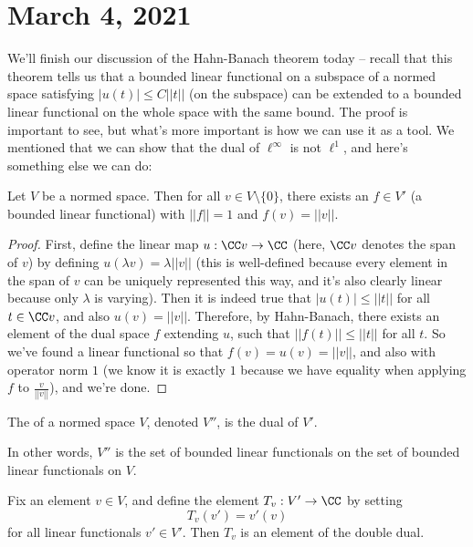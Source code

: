 \pagebreak\section*{March 4, 2021}

We'll finish our discussion of the Hahn-Banach theorem today -- recall that this theorem tells us that a bounded linear functional on a subspace of a normed space satisfying $|u(t)| \le C||t||$ (on the subspace) can be extended to a bounded linear functional on the whole space with the same bound. The proof is important to see, but what's more important is how we can use it as a tool. We mentioned that we can show that the dual of $\ell^{\infty}$ is not $\ell^1$, and here's something else we can do:

\begin{theorem}\label{hahnbanachapp1}
Let $V$ be a normed space. Then for all $v \in V \setminus \{0\}$, there exists an $f \in V'$ (a bounded linear functional) with $||f|| = 1$ and $f(v) = ||v||$.
\end{theorem}
\begin{proof}
First, define the linear map $u: \CC v \to \CC$ (here, $\CC v$ denotes the span of $v$) by defining $u(\lambda v) = \lambda ||v||$ (this is well-defined because every element in the span of $v$ can be uniquely represented this way, and it's also clearly linear because only $\lambda$ is varying). Then it is indeed true that $|u(t)| \le ||t||$ for all $t \in \CC v$, and also $u(v) = ||v||$. Therefore, by Hahn-Banach, there exists an element of the dual space $f$ extending $u$, such that $||f(t)|| \le ||t||$ for all $t$. So we've found a linear functional so that $f(v) = u(v) = ||v||$, and also with operator norm $1$ (we know it is exactly $1$ because we have equality when applying $f$ to $\frac{v}{||v||}$), and we're done. 
\end{proof}

\begin{definition}
The  of a normed space $V$, denoted $V''$, is the dual of $V'$.
\end{definition}

In other words, $V''$ is the set of bounded linear functionals on the set of bounded linear functionals on $V$. 

\begin{example}
Fix an element $v \in V$, and define the element $T_v: V' \to \CC$ by setting 
\[
    T_v(v') = v'(v)
\]
for all linear functionals $v' \in V'$. Then $T_v$ is an element of the double dual.
\end{example}

